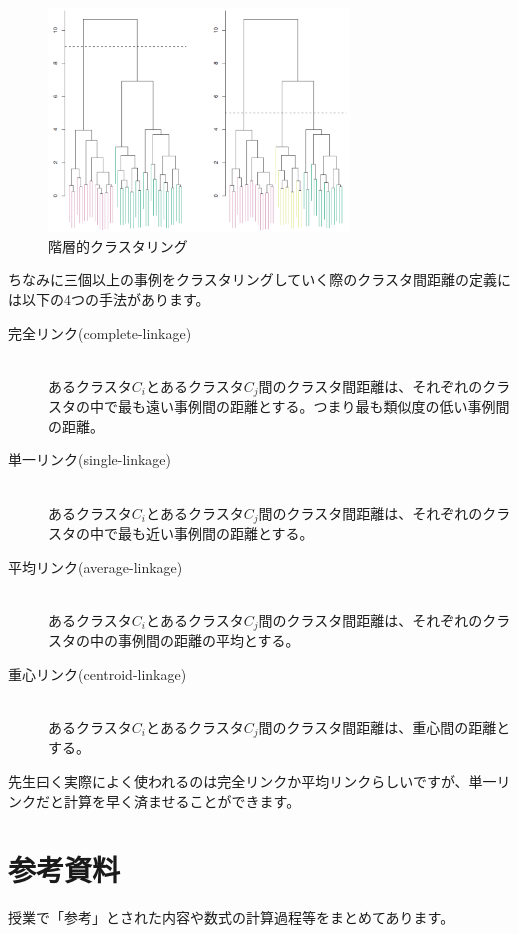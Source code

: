\documentclass[uplatex]{jsarticle}
\begin{document}
\begin{figure}
  \begin{center}
    \includegraphics[width=8cm]{img/cllustering.png}
    \caption{階層的クラスタリング}
  \end{center}
\end{figure}
ちなみに三個以上の事例をクラスタリングしていく際のクラスタ間距離の定義には以下の4つの手法があります。
\begin{description}
  \item [完全リンク(complete-linkage)]\mbox{}\\
  あるクラスタ$C_i$とあるクラスタ$C_j$間のクラスタ間距離は、それぞれのクラスタの中で最も遠い事例間の距離とする。つまり最も類似度の低い事例間の距離。
  \item [単一リンク(single-linkage)]\mbox{}\\
  あるクラスタ$C_i$とあるクラスタ$C_j$間のクラスタ間距離は、それぞれのクラスタの中で最も近い事例間の距離とする。
  \item [平均リンク(average-linkage)]\mbox{}\\
  あるクラスタ$C_i$とあるクラスタ$C_j$間のクラスタ間距離は、それぞれのクラスタの中の事例間の距離の平均とする。
  \item [重心リンク(centroid-linkage)]\mbox{}\\
  あるクラスタ$C_i$とあるクラスタ$C_j$間のクラスタ間距離は、重心間の距離とする。
\end{description}
先生曰く実際によく使われるのは完全リンクか平均リンクらしいですが、単一リンクだと計算を早く済ませることができます。

\section{参考資料}
授業で「参考」とされた内容や数式の計算過程等をまとめてあります。
\end{document}
